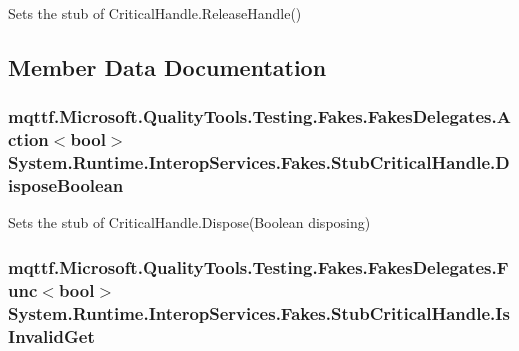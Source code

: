 Sets the stub of Critical\-Handle.\-Release\-Handle()



\subsection{Member Data Documentation}
\hypertarget{class_system_1_1_runtime_1_1_interop_services_1_1_fakes_1_1_stub_critical_handle_a62343173def0e5bce9315e7a95ab4523}{
\subsubsection[{Dispose\-Boolean}]{\setlength{\rightskip}{0pt plus 5cm}mqttf.\-Microsoft.\-Quality\-Tools.\-Testing.\-Fakes.\-Fakes\-Delegates.\-Action$<$bool$>$ System.\-Runtime.\-Interop\-Services.\-Fakes.\-Stub\-Critical\-Handle.\-Dispose\-Boolean}}\label{class_system_1_1_runtime_1_1_interop_services_1_1_fakes_1_1_stub_critical_handle_a62343173def0e5bce9315e7a95ab4523}


Sets the stub of Critical\-Handle.\-Dispose(\-Boolean disposing)

\hypertarget{class_system_1_1_runtime_1_1_interop_services_1_1_fakes_1_1_stub_critical_handle_ad5bbfdfa82aac8a90f3f5e46ab125bf3}{
\subsubsection[{Is\-Invalid\-Get}]{\setlength{\rightskip}{0pt plus 5cm}mqttf.\-Microsoft.\-Quality\-Tools.\-Testing.\-Fakes.\-Fakes\-Delegates.\-Func$<$bool$>$ System.\-Runtime.\-Interop\-Services.\-Fakes.\-Stub\-Critical\-Handle.\-Is\-Invalid\-Get}}\label{class_system_1_1_runtime_1_1_interop_services_1_1_fakes_1_1_stub_critical_handle_ad5bbfdfa82aac8a90f3f5e46ab125bf3}


